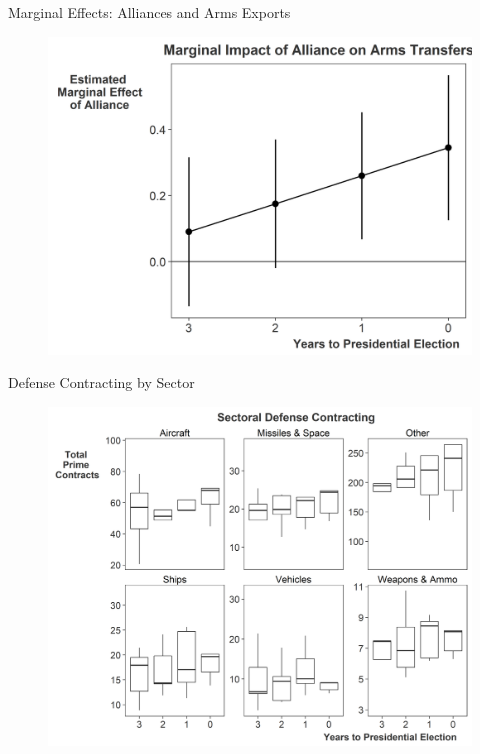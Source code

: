 \documentclass[12pt]{beamer}
\begin{document}

\begin{frame}{Marginal Effects: Alliances and Arms Exports}

\begin{figure}[htbp]
	\centering
		\includegraphics[height=.90\textheight]{us-defense-me-arms.png}
\end{figure}


\end{frame}


\begin{frame}{Defense Contracting by Sector}

\begin{figure}[htbp]
	\centering
		\includegraphics[height=.90\textheight]{contract-cycles-sector.png}
\end{figure}


\end{frame}





\end{document}

